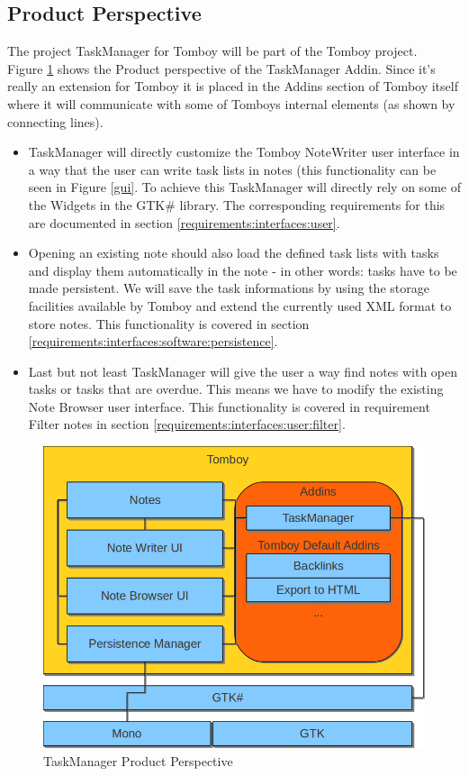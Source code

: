 \subsection{Product Perspective}
\label{description:perspective}
  The project TaskManager for Tomboy will be part of the Tomboy project.\\
  Figure \ref{perspective} shows the Product perspective of the TaskManager Addin. Since it's really an extension for Tomboy it is placed in
  the Addins section of Tomboy itself where it will communicate with some of Tomboys internal elements (as shown by connecting lines).
  \begin{itemize}
    \item TaskManager will directly customize the Tomboy NoteWriter user interface in a way that the user can write task lists in notes 
	(this functionality can be seen in Figure \ref{gui}. To achieve this TaskManager will  directly rely on some of the 
	Widgets in the GTK\# library. The corresponding requirements for this are documented in section \ref{requirements:interfaces:user}.
    \item Opening an existing note should also load the defined task lists with tasks and display them automatically in the note - in other words:
    tasks have to be made persistent.
	We  will save the task informations by using the storage facilities available by Tomboy and extend
    the currently used XML  format to store notes. This functionality is covered in section \ref{requirements:interfaces:software:persistence}.
    \item Last but not least TaskManager will give the user a way find notes with open tasks or tasks that are overdue. This means we have to modify
    the existing Note Browser user interface. This functionality is covered in requirement Filter notes in section \ref{requirements:interfaces:user:filter}.
  \end{itemize}


  \begin{figure}[ht]
    \includegraphics[width=\textwidth]{graphics/product_perspective_diagram.png}
    \caption{TaskManager Product Perspective}
    \label{perspective}
  \end{figure}


